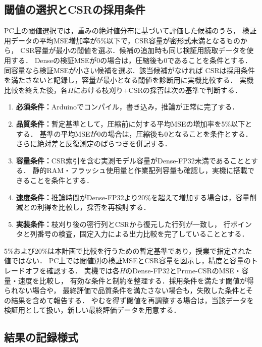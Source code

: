 \documentclass[a4paper,11pt]{article}
\begin{document}
\subsection{閾値の選択とCSRの採用条件}

PC上の閾値選択では，重みの絶対値分布に基づいて評価した候補のうち，
検証用データの平均MSE増加率が5\%以下で，CSR容量が密形式未満となるものから，
CSR容量が最小の閾値を選ぶ．候補の追加時も同じ検証用読取データを使用する．
Denseの検証MSEが0の場合は，圧縮後も0であることを条件とする．
同容量なら検証MSEが小さい候補を選ぶ．該当候補がなければ
CSRは採用条件を満たさないと記録し，容量が最小となる閾値を診断用に実機比較する．
実機比較を終えた後，各$H$における枝刈り+CSRの採否は次の基準で判断する．

\begin{enumerate}
  \item \textbf{必須条件：}Arduinoでコンパイル，書き込み，推論が正常に完了する．
  \item \textbf{品質条件：}暫定基準として，圧縮前に対する平均MSEの増加率を5\%以下とする．
    基準の平均MSEが0の場合は，圧縮後も0となることを条件とする．
    さらに絶対差と反復測定のばらつきを併記する．
  \item \textbf{容量条件：}CSR索引を含む実測モデル容量がDense-FP32未満であることとする．
    静的RAM・フラッシュ使用量と作業配列容量も確認し，実機に搭載できることを条件とする．
  \item \textbf{速度条件：}推論時間がDense-FP32より20\%を超えて増加する場合は，容量削減との利得を比較し，採否を再検討する．
  \item \textbf{実装条件：}枝刈り後の密行列とCSRから復元した行列が一致し，
    行ポインタと列番号の検査，固定入力による出力比較を完了していることとする．
\end{enumerate}

5\%および20\%は本計画で比較を行うための暫定基準であり，授業で指定された値ではない．
PC上では閾値別の検証MSEとCSR容量を図示し，精度と容量のトレードオフを確認する．
実機では各$H$のDense-FP32とPrune-CSRのMSE・容量・速度を比較し，
有効な条件と制約を整理する．採用条件を満たす閾値が得られない場合や，
最終評価で品質条件を満たさない場合も，失敗した条件とその結果を含めて報告する．
やむを得ず閾値を再調整する場合は，当該データを検証用として扱い，新しい最終評価データを用意する．

\subsection{結果の記録様式}
\end{document}
